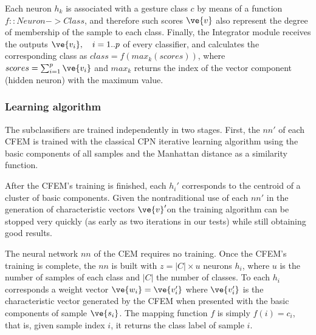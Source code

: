 Each neuron $h_k$ is associated with a gesture class $c$ by means of a function $f::Neuron->Class$, and therefore such scores $\ve{v}$ also represent the degree of membership of the sample to each class. Finally, the Integrator module receives the outputs $\ve{v_i}, \quad i=1..p$ of every classifier, and calculates the corresponding class as $class=f(max_k(scores))$, where $scores=\sum_{i=1}^{p} \ve{v_i}$ and $max_k$ returns the index of the vector component (hidden neuron) with the maximum value.

\subsubsection{Learning algorithm}

The subclassifiers are trained independently in two stages. First, the $nn'$ of each CFEM is trained with the classical CPN iterative learning algorithm using the basic components of all samples and the Manhattan distance as a similarity function.

After the CFEM's training is finished, each $h_i'$ corresponds to the centroid of a cluster of basic components. Given the nontraditional use of each $nn'$ in the generation of characteristic vectors $\ve{v}'$on the training algorithm can be stopped very quickly (as early as two iterations in our tests) while still obtaining good results.

The neural network $nn$ of the CEM requires no training. Once the CFEM's training is complete, the $nn$ is built with $z = |C| \times u$ neurons $h_i$, where $u$ is the number of samples of each class and $|C|$ the number of classes.  To each $h_i$ corresponds a weight vector $\ve{w_i}=\ve{v_i'}$ where $\ve{v_i'}$ is the characteristic vector generated by the CFEM when presented with the basic components of sample $\ve{s_{i}}$. The mapping function $f$ is simply $f(i)=c_i$, that is, given sample index $i$, it returns the class label of sample $i$. 